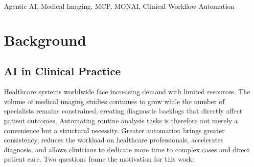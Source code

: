 \documentclass[conference]{IEEEtran}
\begin{document}
\begin{IEEEkeywords}
Agentic AI, Medical Imaging, MCP, MONAI, Clinical Workflow Automation
\end{IEEEkeywords}

\section{Background}
\label{sec:background}

\subsection{AI in Clinical Practice}
Healthcare systems worldwide face increasing demand with limited resources. The volume of medical imaging studies continues to grow while the number of specialists remains constrained, creating diagnostic backlogs that directly affect patient outcomes. Automating routine analysis tasks is therefore not merely a convenience but a structural necessity. Greater automation brings greater consistency, reduces the workload on healthcare professionals, accelerates diagnosis, and allows clinicians to dedicate more time to complex cases and direct patient care.
Two questions frame the motivation for this work:

\end{document}
